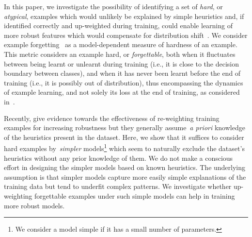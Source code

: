 In this paper, we investigate the possibility of identifying a set of \emph{hard}, or \emph{atypical}, examples which would unlikely be explained by simple heuristics and, if identified correctly and up-weighted during training, could enable learning of more robust features which would compensate for distribution shift~\citep{sugiyama2007covariate}.
We consider example forgetting~\cite{toneva2018empirical} as a model-dependent measure of hardness of an example. This metric considers an example hard, or \emph{forgettable}, both when it fluctuates between being learnt or unlearnt during training (i.e., it is close to the decision boundary between classes), and when it has never been learnt before the end of training (i.e., it is possibly out of distribution), thus encompassing the dynamics of example learning, and not solely its loss at the end of training, as considered in~.

Recently,  give evidence towards the effectiveness of re-weighting training examples for increasing robustness but they  generally assume~\emph{a priori} knowledge of the heuristics present in the dataset. 
Here, we show that it suffices to consider hard examples by~\emph{simpler} models\footnote{We consider a model simple if it has a small number of parameters.} which seem to naturally exclude the dataset's heuristics without any prior knowledge of them. We do not make a conscious effort in designing the simpler models based on known heuristics. The underlying assumption is that simpler models capture more easily simple explanations of the training data but tend to underfit complex patterns. We investigate whether up-weighting forgettable examples under such simple models can help in training more robust models.


